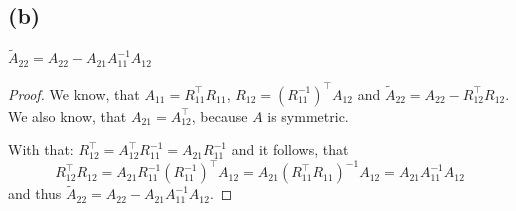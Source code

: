 \documentclass[a4paper, 11pt]{article}
\begin{document}
\subsection*{(b)}
$\tilde{A}_{22} = A_{22} - A_{21}A_{11}^{-1}A_{12}$
\begin{proof}
  We know, that $A_{11} =  R_{11}^\top R_{11}$, $R_{12} = (R_{11}^{-1})^\top
  A_{12}$ and $\tilde{A}_{22} = A_{22} - R_{12}^\top R_{12}$.  We also know,
  that $A_{21} = A_{12}^\top$, because $A$ is symmetric.

  With that: $R_{12}^\top = A_{12}^\top R_{11}^{-1} = A_{21}R_{11}^{-1}$
  and it follows, that
  \begin{equation*}
    R_{12}^\top R_{12} = A_{21}R_{11}^{-1}(R_{11}^{-1})^\top A_{12} =
    A_{21}(R_{11}^\top R_{11})^{-1} A_{12} = A_{21}A_{11}^{-1} A_{12}
  \end{equation*}
  and thus $\tilde{A}_{22} = A_{22} - A_{21}A_{11}^{-1}A_{12}$.
\end{proof}
\end{document}
